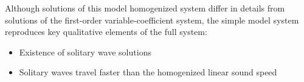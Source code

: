 Although solutions of this model homogenized system differ in details
from solutions of the first-order variable-coefficient system, the
simple model system reproduces key qualitative elements of the full system:
\begin{itemize}
  \item Existence of solitary wave solutions
  \item Solitary waves travel faster than the homogenized linear sound speed
\end{itemize}
%
